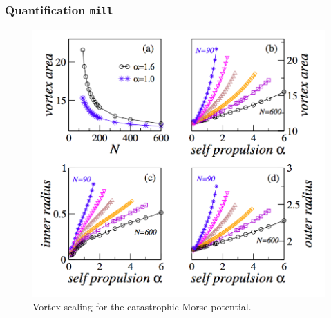 \documentclass[compress]{beamer}
\begin{document}
\begin{frame}
	\frametitle{Quantification \texttt{mill}}
	
	\begin{figure}[H]
		\includegraphics[width=.7 \columnwidth]{./img/vortexScaling.png}
		\caption{Vortex scaling for the catastrophic Morse potential.}
		\label{vortexScaling}
	\end{figure}
	
	
\end{frame}
\end{document}
